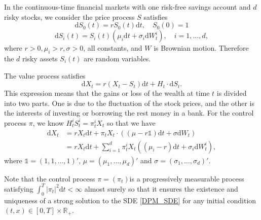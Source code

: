 \documentclass[a4paper]{article}
\theoremstyle{definition}
\newtheorem{assumption}[theorem]{Assumption}
\numberwithin{equation}{section}
\begin{document}
In the continuous-time financial markets with one risk-free savings account and $d$ risky stocks, we consider the price process $S$ satisfies
$$\mathrm dS_0(t)=rS_0(t)\mathrm dt,\quad S_0(0)=1$$
$$\mathrm dS_i(t)=S_i(t)(\mu_i\mathrm dt+\sigma_i\mathrm dW^i_t),\quad i=1,\dots,d,$$
where $r>0,\mu_i>r,\sigma>0$, all constants, and $W$ is Brownian motion. Therefore the $d$ risky assets $S_i(t)$ are random variables.

The value process satisfies
$$\mathrm dX_t=r(X_t-S_t)\mathrm dt+H_t\cdot\mathrm dS_t.$$
This expression means that the gains or loss of the wealth at time $t$ is divided into two parts. One is due to the fluctuation of the stock prices, and the other is the interests of investing or borrowing the rest money in a bank.
For the control process $\pi$, we know $H^i_tS^i_t=\pi^i_tX_t$ so that we have
\begin{equation}\label{DPM_SDE}
\begin{aligned}
\mathrm dX_t&=rX_t\mathrm dt+\pi_tX_t\cdot((\mu-r\mathds 1)\mathrm dt+\sigma\mathrm dW_t)\\
&=rX_t\mathrm dt+\sum^d_{i=1}\pi^i_tX_t((\mu_i-r)\mathrm dt+\sigma_i\mathrm dW^i_t),
\end{aligned}
\end{equation}
where $\mathds 1=(1,1,\dots,1)'$, $\mu=(\mu_1,\dots,\mu_d)'$ and $\sigma=(\sigma_1,\dots,\sigma_d)'$.

Note that the control process $\pi=(\pi_t)$is a progressively measurable process satisfying $\int^T_0|\pi_t|^2\mathrm dt<\infty$ almost surely so that it ensures the existence and uniqueness of a strong solution to the SDE
\eqref{DPM_SDE} for any initial condition $(t,x)\in[0,T]\times \mathbb R_+$.

\end{document}
